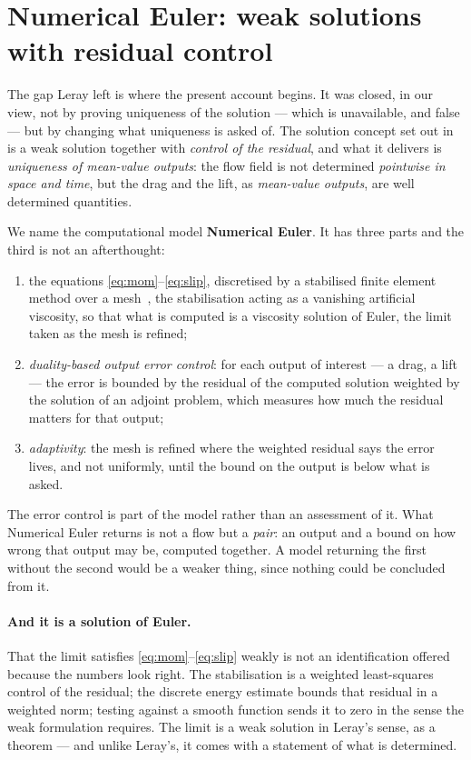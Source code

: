 \documentclass[11pt]{article}
\begin{document}
\section{Numerical Euler: weak solutions with residual control}\label{sec:digital}

The gap Leray left is where the present account begins. It was closed, in our view, not by proving
uniqueness of the solution --- which is unavailable, and false --- but by changing what uniqueness is
asked of. The solution concept set out in~\cite{book} is a weak solution together with
\emph{control of the residual}, and what it delivers is \emph{uniqueness of mean-value outputs}: the
flow field is not determined \emph{pointwise in space and time}, but the drag and the lift, as
\emph{mean-value outputs}, are well determined quantities.

We name the computational model \textbf{Numerical Euler}. It has three parts and the third is not an
afterthought:

\begin{enumerate}
\item the equations \eqref{eq:mom}--\eqref{eq:slip}, discretised by a stabilised finite element
method over a mesh~\cite{book}, the stabilisation acting as a vanishing artificial viscosity, so that
what is computed is a viscosity solution of Euler, the limit taken as the mesh is refined;
\item \emph{duality-based output error control}: for each output of interest --- a drag, a lift ---
the error is bounded by the residual of the computed solution weighted by the solution of an adjoint
problem, which measures how much the residual matters for that output;
\item \emph{adaptivity}: the mesh is refined where the weighted residual says the error lives, and
not uniformly, until the bound on the output is below what is asked.
\end{enumerate}

The error control is part of the model rather than an assessment of it. What Numerical Euler returns
is not a flow but a \emph{pair}: an output and a bound on how wrong that output may be, computed
together. A model returning the first without the second would be a weaker thing, since nothing could
be concluded from it.

\paragraph{And it is a solution of Euler.} That the limit satisfies
\eqref{eq:mom}--\eqref{eq:slip} weakly is not an identification offered because the numbers look
right. The stabilisation is a weighted least-squares control of the residual; the discrete energy
estimate bounds that residual in a weighted norm; testing against a smooth function sends it to zero
in the sense the weak formulation requires. The limit is a weak solution in Leray's sense, as a
theorem --- and unlike Leray's, it comes with a statement of what is determined.
\end{document}
